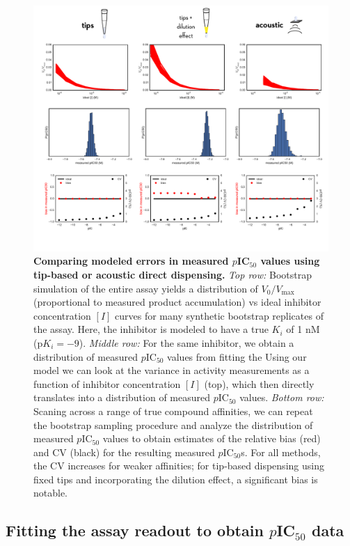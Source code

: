 \documentclass[aps,pre,twocolumn,nofootinbib,superscriptaddress,linenumbers]{revtex4-1}
\begin{document}
\begin{figure}[tb]
\includegraphics[width=1.0\textwidth]{../figures/acoustic-vs-tips.pdf}
  
  \caption{{\bf Comparing modeled errors in measured $p$IC$_{50}$ values using tip-based or acoustic direct dispensing.}
  \emph{Top row:} Bootstrap simulation of the entire assay yields a distribution of $V_0/V_\mathrm{max}$ (proportional to measured product accumulation) vs ideal inhibitor concentration $[I]$ curves for many synthetic bootstrap replicates of the assay.  
  Here, the inhibitor is modeled to have a true $K_i$ of 1 nM (p$K_i = -9$).
  \emph{Middle row:} For the same inhibitor, we obtain a distribution of measured $p$IC$_{50}$ values from fitting the Using our model we can look at the variance in activity measurements as a function of inhibitor concentration $[I]$ (top), which then directly translates into a distribution of measured $p$IC$_{50}$ values.
  \emph{Bottom row:} Scaning across a range of true compound affinities, we can repeat the bootstrap sampling procedure and analyze the distribution of measured $p$IC$_{50}$ values to obtain estimates of the relative bias (red) and CV (black) for the resulting measured $p$IC$_{50}$s.
  For all methods, the CV increases for weaker affinities; for tip-based dispensing using fixed tips and incorporating the dilution effect, a significant bias is notable.
  }
  \label{fig:acoustic-vs-tips}
\end{figure}

\subsection*{Fitting the assay readout to obtain $p$IC$_{50}$ data}
\end{document}
